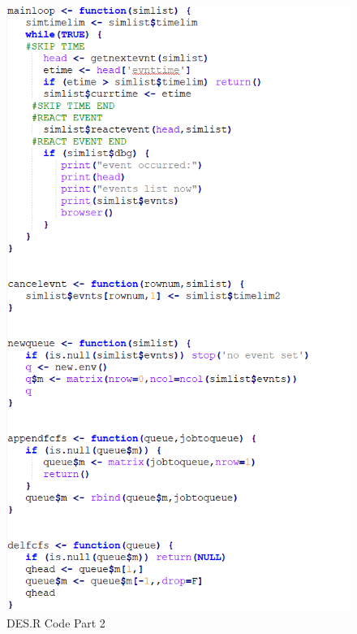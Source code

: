 \documentclass[a4paper, 11pt]{article} %
\begin{document}
\begin{figure}[H]
	\caption{DES.R Code Part 2}
	\includegraphics{des2}
	\centering
\end{figure} \pagebreak
\end{document}
